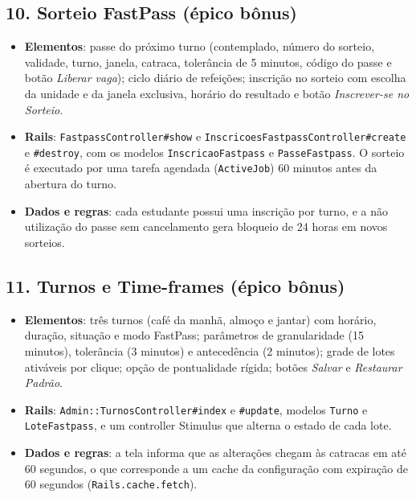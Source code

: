 \documentclass[a4paper,12pt]{article}
\renewcommand{\_}{\textunderscore\allowbreak}
\begin{document}
\subsection*{10. Sorteio FastPass (épico bônus)}

\begin{itemize}

    \item \textbf{Elementos}: passe do próximo turno (contemplado, número do sorteio, validade, turno, janela, catraca, tolerância de 5 minutos, código do passe e botão \textit{Liberar vaga}); ciclo diário de refeições; inscrição no sorteio com escolha da unidade e da janela exclusiva, horário do resultado e botão \textit{Inscrever-se no Sorteio}.

    \item \textbf{Rails}: \texttt{FastpassController\#\allowbreak{}show} e \texttt{InscricoesFastpassController\#\allowbreak{}create} e \texttt{\#destroy}, com os modelos \texttt{InscricaoFastpass} e \texttt{PasseFastpass}. O sorteio é executado por uma tarefa agendada (\texttt{ActiveJob}) 60 minutos antes da abertura do turno.

    \item \textbf{Dados e regras}: cada estudante possui uma inscrição por turno, e a não utilização do passe sem cancelamento gera bloqueio de 24 horas em novos sorteios.

\end{itemize}

\subsection*{11. Turnos e Time-frames (épico bônus)}

\begin{itemize}

    \item \textbf{Elementos}: três turnos (café da manhã, almoço e jantar) com horário, duração, situação e modo FastPass; parâmetros de granularidade (15 minutos), tolerância (3 minutos) e antecedência (2 minutos); grade de lotes ativáveis por clique; opção de pontualidade rígida; botões \textit{Salvar} e \textit{Restaurar Padrão}.

    \item \textbf{Rails}: \texttt{Admin::\allowbreak{}TurnosController\#\allowbreak{}index} e \texttt{\#update}, modelos \texttt{Turno} e \texttt{LoteFastpass}, e um controller Stimulus que alterna o estado de cada lote.

    \item \textbf{Dados e regras}: a tela informa que as alterações chegam às catracas em até 60 segundos, o que corresponde a um cache da configuração com expiração de 60 segundos (\texttt{Rails.\allowbreak{}cache.\allowbreak{}fetch}).

\end{itemize}
\end{document}
